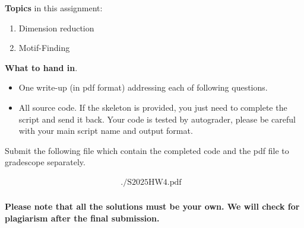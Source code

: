\noindent 
{\bf Topics} in this assignment: 
\begin{enumerate}
\item Dimension reduction
\item Motif-Finding
\end{enumerate}
\vspace{0.2in}


\noindent 
{\bf What to hand in}. 
\begin{itemize}
\item One write-up (in pdf format) addressing each of following questions.
\item All source code. If the skeleton is provided, you just need to complete the script and send it back. Your code is tested by autograder, please be careful with your main script name and output format.
\end{itemize}

Submit the following file which contain the completed code and the
pdf file to gradescope separately. 

\[
  \begin{array}{lllll}
    ./\text{S2025HW4.pdf}&  \\
  \end{array}
\]

\textbf{ Please note that all the solutions must be your own. We will check for plagiarism after the final submission. } 